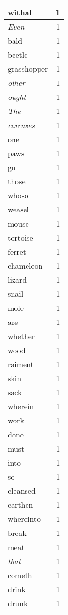 \begin{center}
\begin{longtable}{l|r}
withal & 1 \\ \hline
\emph{Even} & 1 \\ \hline
bald & 1 \\ \hline
beetle & 1 \\ \hline
grasshopper & 1 \\ \hline
\emph{other} & 1 \\ \hline
\emph{ought} & 1 \\ \hline
\emph{The} & 1 \\ \hline
\emph{carcases} & 1 \\ \hline
one & 1 \\ \hline
paws & 1 \\ \hline
go & 1 \\ \hline
those & 1 \\ \hline
whoso & 1 \\ \hline
weasel & 1 \\ \hline
mouse & 1 \\ \hline
tortoise & 1 \\ \hline
ferret & 1 \\ \hline
chameleon & 1 \\ \hline
lizard & 1 \\ \hline
snail & 1 \\ \hline
mole & 1 \\ \hline
are & 1 \\ \hline
whether & 1 \\ \hline
wood & 1 \\ \hline
raiment & 1 \\ \hline
skin & 1 \\ \hline
sack & 1 \\ \hline
wherein & 1 \\ \hline
work & 1 \\ \hline
done & 1 \\ \hline
must & 1 \\ \hline
into & 1 \\ \hline
so & 1 \\ \hline
cleansed & 1 \\ \hline
earthen & 1 \\ \hline
whereinto & 1 \\ \hline
break & 1 \\ \hline
meat & 1 \\ \hline
\emph{that} & 1 \\ \hline
cometh & 1 \\ \hline
drink & 1 \\ \hline
drunk & 1 \\ \hline

\end{longtable}
\end{center}
